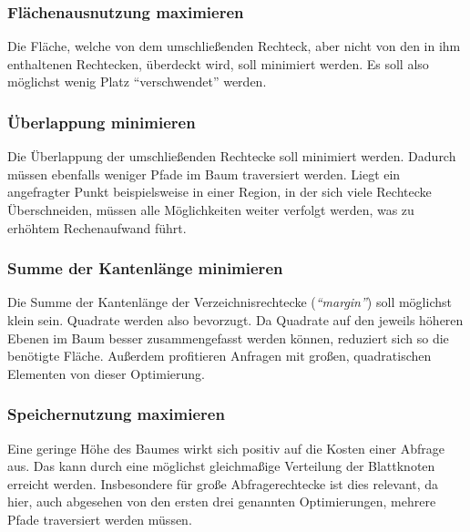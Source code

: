\documentclass[runningheads,a4paper]{llncs}
\begin{document}
{	\subsubsection{Flächenausnutzung maximieren} %
	\label{ssub:flaechenausnutzung}

	Die Fläche, welche von dem umschließenden Rechteck, aber nicht von den in ihm enthaltenen Rechtecken, überdeckt wird, soll minimiert werden. Es soll also möglichst wenig Platz \enquote{verschwendet} werden. \citep[vgl.][323]{Beckmann:1990}


	\subsubsection{Überlappung minimieren} %
	\label{ssub:ueberlappung_minimieren}

	Die Überlappung der umschließenden Rechtecke soll minimiert werden. Dadurch müssen ebenfalls weniger Pfade im Baum traversiert werden. Liegt ein angefragter Punkt beispielsweise in einer Region, in der sich viele Rechtecke Überschneiden, müssen alle Möglichkeiten weiter verfolgt werden, was zu erhöhtem Rechenaufwand führt.
	

	\subsubsection{Summe der Kantenlänge minimieren} %
	\label{ssub:kantenlaenge}

	Die Summe der Kantenlänge der Verzeichnisrechtecke (\emph{\enquote{margin}}) soll möglichst klein sein. Quadrate werden also bevorzugt. Da Quadrate auf den jeweils höheren Ebenen im Baum besser zusammengefasst werden können, reduziert sich so die benötigte Fläche.
	Außerdem profitieren Anfragen mit großen, quadratischen Elementen von dieser Optimierung. \citep[vgl.][323]{Beckmann:1990}
	

	\subsubsection{Speichernutzung maximieren} %
	\label{ssub:speichernutzung_maximieren}

	Eine geringe Höhe des Baumes wirkt sich positiv auf die Kosten einer Abfrage aus. Das kann durch eine möglichst gleichmaßige Verteilung der Blattknoten erreicht werden. Insbesondere für große Abfragerechtecke ist dies relevant, da hier, auch abgesehen von den ersten drei genannten Optimierungen, mehrere Pfade traversiert werden müssen. \citep[vgl.][323-324]{Beckmann:1990}
	
}
\end{document}
